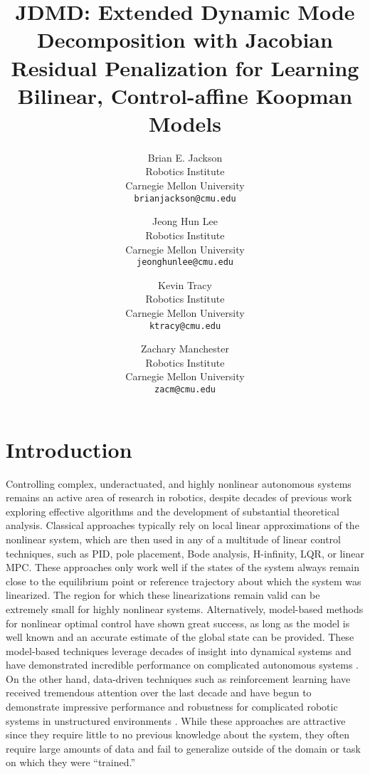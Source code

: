 \documentclass{article}
\title{JDMD: Extended Dynamic Mode Decomposition with Jacobian Residual Penalization
for Learning Bilinear, Control-affine Koopman Models}
\author{
  Brian E. Jackson \\
  Robotics Institute \\
  Carnegie Mellon University\\
  \texttt{brianjackson@cmu.edu} \\
  \and
  Jeong Hun Lee \\
  Robotics Institute\\
  Carnegie Mellon University\\
  \texttt{jeonghunlee@cmu.edu} \\
  \and
  Kevin Tracy \\
  Robotics Institute\\
  Carnegie Mellon University\\
  \texttt{ktracy@cmu.edu} \\
  \and
  Zachary Manchester \\
  Robotics Institute\\
  Carnegie Mellon University\\
  \texttt{zacm@cmu.edu} \\
}
\begin{document}
\maketitle


\section{Introduction}

    Controlling complex, underactuated, and highly nonlinear autonomous systems remains an
    active area of research in robotics, despite decades of previous work exploring
    effective algorithms and the development of substantial theoretical analysis. Classical
    approaches typically rely on local linear approximations of the nonlinear system, which
    are then used in any of a multitude of linear control techniques, such as PID, pole
    placement, Bode analysis, H-infinity, LQR, or linear MPC.  These approaches only work
    well if the states of the system always remain close to the equilibrium point or
    reference trajectory about which the system was linearized. The region for which these
    linearizations remain valid can be extremely small for highly nonlinear systems.
    Alternatively, model-based methods for nonlinear optimal control have shown great
    success, as long as the model is well known and an accurate estimate of the global state
    can be provided. These model-based techniques leverage decades of insight into
    dynamical systems and have demonstrated incredible performance on complicated
    autonomous systems 
    \cite{farshidian_efficient_2017,Kuindersma2014,Bjelonic2021,Subosits2019} .  On the
    other hand, data-driven techniques such as reinforcement learning have received
    tremendous attention over the last decade and have begun to demonstrate impressive
    performance and robustness for complicated robotic systems in unstructured environments
    \cite{Karnchanachari2020,Hoeller2020,Li2021}. While these approaches are attractive
    since they require little to no previous knowledge about the system, they often require
    large amounts of data and fail to generalize outside of the domain or task on which they
    were ``trained.''
    
\end{document}
